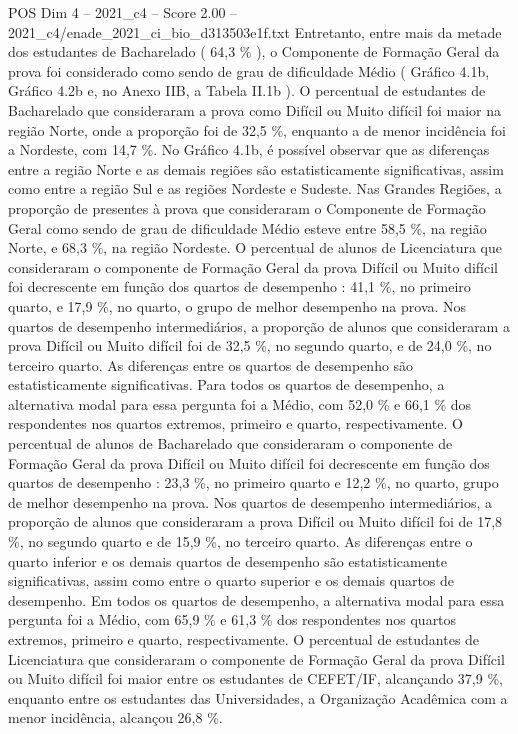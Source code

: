 \begin{textsample}{POS Dim 4 – 2021\_c4 – Score 2.00 – 2021\_c4/enade\_2021\_ci\_bio\_d313503e1f.txt}
Entretanto, entre mais da metade dos estudantes de Bacharelado ( 64,3 \% ), o Componente de Formação Geral da prova foi considerado como sendo de grau de dificuldade Médio ( Gráfico 4.1b, Gráfico 4.2b e, no Anexo IIB, a Tabela II.1b ).
O percentual de estudantes de Bacharelado que consideraram a prova como Difícil ou Muito difícil foi maior na região Norte, onde a proporção foi de 32,5 \%, enquanto a de menor incidência foi a Nordeste, com 14,7 \%.
No Gráfico 4.1b, é possível observar que as diferenças entre a região Norte e as demais regiões são estatisticamente significativas, assim como entre a região Sul e as regiões Nordeste e Sudeste.
Nas Grandes Regiões, a proporção de presentes à prova que consideraram o Componente de Formação Geral como sendo de grau de dificuldade Médio esteve entre 58,5 \%, na região Norte, e 68,3 \%, na região Nordeste.
O percentual de alunos de Licenciatura que consideraram o componente de Formação Geral da prova Difícil ou Muito difícil foi decrescente em função dos quartos de desempenho : 41,1 \%, no primeiro quarto, e 17,9 \%, no quarto, o grupo de melhor desempenho na prova.
Nos quartos de desempenho intermediários, a proporção de alunos que consideraram a prova Difícil ou Muito difícil foi de 32,5 \%, no segundo quarto, e de 24,0 \%, no terceiro quarto.
As diferenças entre os quartos de desempenho são estatisticamente significativas.
Para todos os quartos de desempenho, a alternativa modal para essa pergunta foi a Médio, com 52,0 \% e 66,1 \% dos respondentes nos quartos extremos, primeiro e quarto, respectivamente.
O percentual de alunos de Bacharelado que consideraram o componente de Formação Geral da prova Difícil ou Muito difícil foi decrescente em função dos quartos de desempenho : 23,3 \%, no primeiro quarto e 12,2 \%, no quarto, grupo de melhor desempenho na prova.
Nos quartos de desempenho intermediários, a proporção de alunos que consideraram a prova Difícil ou Muito difícil foi de 17,8 \%, no segundo quarto e de 15,9 \%, no terceiro quarto.
As diferenças entre o quarto inferior e os demais quartos de desempenho são estatisticamente significativas, assim como entre o quarto superior e os demais quartos de desempenho.
Em todos os quartos de desempenho, a alternativa modal para essa pergunta foi a Médio, com 65,9 \% e 61,3 \% dos respondentes nos quartos extremos, primeiro e quarto, respectivamente.
O percentual de estudantes de Licenciatura que consideraram o componente de Formação Geral da prova Difícil ou Muito difícil foi maior entre os estudantes de CEFET/IF, alcançando 37,9 \%, enquanto entre os estudantes das Universidades, a Organização Acadêmica com a menor incidência, alcançou 26,8 \%.

\end{textsample}
